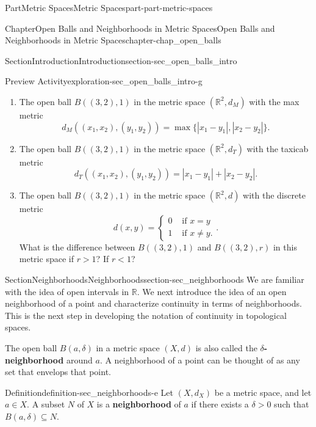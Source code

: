\documentclass[oneside,10pt,]{book}
\newcommand{\terminology}[1]{\textbf{#1}}
\numberwithin{equation}{chapter}
\newcommand{\R}{\mathbb{R}}
\newcommand{\lt}{<}
\newcommand{\gt}{>}
\newcommand{\amp}{&}
\begin{document}
\begin{partptx}{Part}{Metric Spaces}{}{Metric Spaces}{}{}{part-part-metric-spaces}
\begin{chapterptx}{Chapter}{Open Balls and Neighborhoods in Metric Spaces}{}{Open Balls and Neighborhoods in Metric Spaces}{}{}{chapter-chap_open_balls}
\begin{sectionptx}{Section}{Introduction}{}{Introduction}{}{}{section-sec_open_balls_intro}
\begin{exploration}{Preview Activity}{}{exploration-sec_open_balls_intro-g}
\begin{enumerate}[font=\bfseries,label=(\alph*),ref=\alph*]
\begin{equation*}
d_E((x_1,x_2),(y_1,y_2)) = \sqrt{(x_1-y_1)^2 + (x_2-y_2)^2}\text{.}
\end{equation*}
%
\item{}The open ball \(B((3,2), 1)\) in the metric space \((\R^2, d_M)\) with the max metric%
\begin{equation*}
d_M((x_1,x_2),(y_1,y_2)) = \max\{| x_1-y_1 |, | x_2-y_2 |\}\text{.}
\end{equation*}
%
\item{}The open ball \(B((3,2), 1)\) in the metric space \((\R^2, d_T)\) with the taxicab metric%
\begin{equation*}
d_T((x_1,x_2),(y_1,y_2)) = | x_1-y_1 | + | x_2-y_2 |\text{.}
\end{equation*}
%
\item{}The open ball \(B((3,2), 1)\) in the metric space \((\R^2, d)\) with the discrete metric%
\begin{equation*}
d(x,y) = \begin{cases}0 \amp \text{ if }  x=y \\ 1 \amp \text{ if }  x \neq y. \end{cases}\text{.}
\end{equation*}
What is the difference between \(B((3,2),1)\) and \(B((3,2),r)\) in this metric space if \(r > 1\)? If \(r \lt  1\)?%
\end{enumerate}%
\end{exploration}%
\end{sectionptx}
%
%
\typeout{************************************************}
\typeout{************************************************}
%
\begin{sectionptx}{Section}{Neighborhoods}{}{Neighborhoods}{}{}{section-sec_neighborhoods}
%
We are familiar with the idea of open intervals in \(\R\). We next introduce the idea of an open neighborhood of a point and characterize continuity in terms of neighborhoods. This is the next step in developing the notation of continuity in topological spaces.%
\par
The open ball \(B(a, \delta)\) in a metric space \((X,d)\) is also called the \terminology{\(\delta\)-neighborhood} around \(a\). A neighborhood of a point can be thought of as any set that envelops that point.%
\begin{definition}{Definition}{}{definition-sec_neighborhoods-e}%
%
Let \((X, d_X)\) be a metric space, and let \(a \in X\). A subset \(N\) of \(X\) is a \terminology{neighborhood} of \(a\) if there exists a \(\delta \gt 0\) such that \(B(a, \delta) \subseteq N\).%

\end{definition}
\end{sectionptx}
\end{chapterptx}
\end{partptx}
\end{document}
